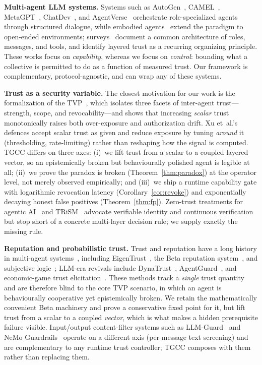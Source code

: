 \documentclass[sigconf,anonymous]{acmart}
\theoremstyle{plain}
\theoremstyle{definition}
\theoremstyle{remark}
\begin{document}
\textbf{Multi-agent LLM systems.}
Systems such as AutoGen~\cite{wu2023autogen}, CAMEL~\cite{li2023camel},
MetaGPT~\cite{hong2308metagpt}, ChatDev~\cite{qian2023chatdev}, and
AgentVerse~\cite{chen2023agentverse} orchestrate role-specialized agents through
structured dialogue, while embodied agents~\cite{wang2023voyager,park2023generative}
extend the paradigm to open-ended environments;
surveys~\cite{wang2024survey,guo2024llmmultiagent,tran2025multiagent,hossain2026safe}
document a common architecture of roles, messages, and tools, and identify
layered trust as a recurring organizing principle. These works focus on
\emph{capability}, whereas we focus on \emph{control}: bounding what a
collective is permitted to do as a function of measured trust. Our framework
is complementary, protocol-agnostic, and can wrap any of these systems.

\textbf{Trust as a security variable.}
The closest motivation for our work is the formalization of the
TVP~\cite{qi2025trust}, which isolates three facets of inter-agent trust---strength,
scope, and revocability---and shows that increasing \emph{scalar} trust monotonically
raises both over-exposure and authorization drift. Xu et~al.'s defences accept scalar
trust as given and reduce exposure by tuning \emph{around} it (thresholding,
rate-limiting) rather than reshaping how the signal is computed. TGCC differs on three
axes: (i)~we lift trust from a scalar to a coupled layered vector, so an epistemically
broken but behaviourally polished agent is legible at all; (ii)~we prove the paradox is
broken (Theorem~\ref{thm:paradox}) at the operator level, not merely observed
empirically; and (iii)~we ship a runtime capability gate with logarithmic revocation
latency (Corollary~\ref{cor:revoke}) and exponentially decaying honest false positives
(Theorem~\ref{thm:fp}). Zero-trust treatments for agentic
AI~\cite{zerotrust2025,nist800207} and TRiSM~\cite{trism2026} advocate verifiable
identity and continuous verification but stop short of a concrete multi-layer decision
rule; we supply exactly the missing rule.

\textbf{Reputation and probabilistic trust.}
Trust and reputation have a long history in multi-agent
systems~\cite{ramchurn2004trust,sabater2005review}, including
EigenTrust~\cite{kamvar2003eigentrust}, the Beta reputation
system~\cite{josang2002beta}, and subjective logic~\cite{josang2016subjective}; LLM-era
revivals include DynaTrust~\cite{dynatrust2026}, AgentGuard~\cite{agentguard2025}, and
economic-game trust elicitation~\cite{econgames2026}. These methods track a
\emph{single} trust quantity and are therefore blind to the core TVP scenario, in which
an agent is behaviourally cooperative yet epistemically broken. We retain the
mathematically convenient Beta machinery and prove a conservative fixed point for it, but
lift trust from a scalar to a coupled \emph{vector}, which is what makes a hidden
prerequisite failure visible. Input/output content-filter systems such as
LLM-Guard~\cite{llmguard2024} and NeMo Guardrails~\cite{nemoguardrails2023} operate on a
different axis (per-message text screening) and are complementary to any runtime trust
controller; TGCC composes with them rather than replacing them.
\end{document}
